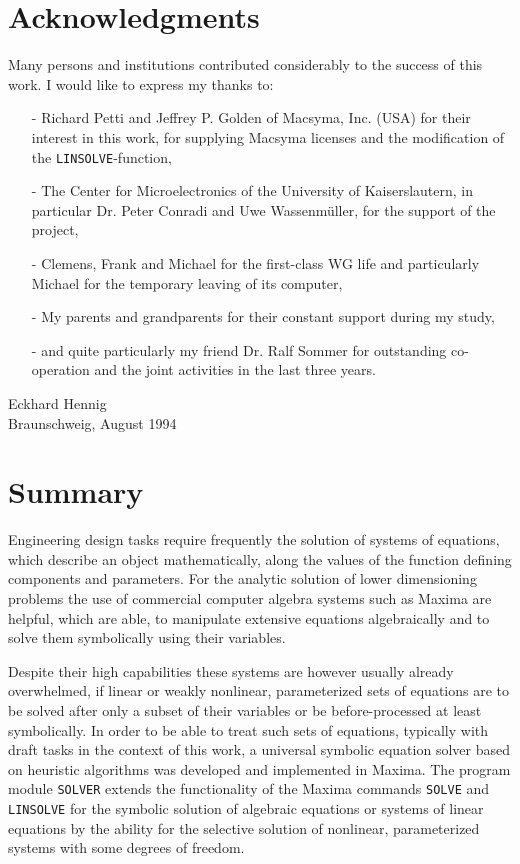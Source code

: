 \documentclass[11pt]{report}           %
\newcounter{problem}
\begin{document}
\chapter*{Acknowledgments}
\thispagestyle{empty}
Many persons and institutions contributed considerably to the success of this work. 
I would like to express my thanks to:
\vspace{1cm}
\begin{itemize}
\item[-] Richard Petti and Jeffrey P. Golden of Macsyma, Inc. (USA) for their interest in this work,
   for supplying Macsyma licenses and the modification of the  \verb+LINSOLVE+-function,
\item[-] The Center for Microelectronics of the University of Kaiserslautern, in particular
   Dr. Peter Conradi and Uwe Wassenm\"uller, for the support of the project,
   
\item[-] Clemens, Frank and Michael for the first-class WG life and particularly Michael for the
   temporary leaving of its computer,
\item[-] My parents and grandparents for their constant support during my study,
\item[-] and quite particularly my friend Dr. Ralf Sommer for outstanding co-operation and the
   joint activities in the last three years.
\end{itemize}
\vspace{1cm}
Eckhard Hennig \\
Braunschweig, August 1994

\cleardoublepage

\chapter*{Summary}
\thispagestyle{empty}

Engineering design tasks  require frequently the solution of systems of equations, which describe an object mathematically, along the values of the function defining components and parameters. For the analytic solution of lower dimensioning problems the use of commercial computer algebra systems such as Maxima are helpful, which are able, to manipulate extensive equations algebraically and to solve them symbolically using their variables.

Despite their high capabilities these systems are however usually already overwhelmed, if linear or weakly nonlinear, parameterized sets of equations are to be solved after only a subset of their variables or be before-processed at least symbolically. In order to be able to treat such sets of equations, typically with draft tasks in the context of this work, a universal symbolic equation solver based on heuristic algorithms was developed and implemented in Maxima. The program module  \verb+SOLVER+ extends the functionality of the Maxima commands \verb+SOLVE+ and  \verb+LINSOLVE+  for the symbolic solution of algebraic equations or  systems of linear equations by the ability for the selective solution of nonlinear, parameterized systems with some degrees of freedom.
\end{document}
